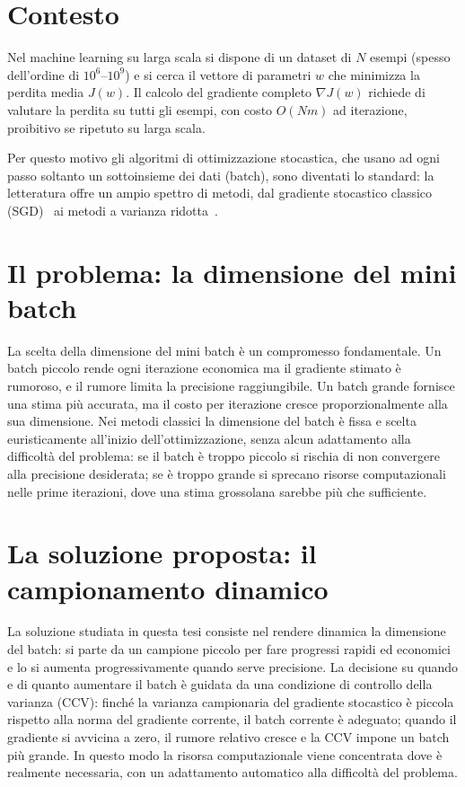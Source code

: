 \documentclass[italian, a4paper, twoside, binding=6mm]{sapthesis}
\begin{document}
\section{Contesto}

Nel machine learning su larga scala si dispone di un dataset di $N$
esempi (spesso dell'ordine di $10^6$--$10^9$) e si cerca il vettore di
parametri $w$ che minimizza la perdita media $J(w)$. Il calcolo del gradiente
completo $\nabla J(w)$ richiede di valutare la perdita su tutti gli esempi,
con costo $O(Nm)$ ad iterazione, proibitivo se ripetuto su larga scala.

Per questo motivo gli algoritmi di ottimizzazione stocastica, che usano ad ogni
passo soltanto un sottoinsieme dei dati (batch), sono diventati lo standard: la
letteratura offre un ampio spettro di metodi, dal gradiente stocastico classico
(SGD)~\cite{robbins1951, bottou2008} ai metodi a varianza
ridotta~\cite{defazio2014, johnson2013}.

\section{Il problema: la dimensione del mini batch}

La scelta della dimensione del mini batch è un compromesso fondamentale. Un
batch piccolo rende ogni iterazione economica ma il gradiente stimato è
rumoroso, e il rumore limita la precisione raggiungibile. Un batch
grande fornisce una stima più accurata, ma il costo per iterazione cresce
proporzionalmente alla sua dimensione. Nei metodi classici la dimensione del
batch è fissa e scelta euristicamente all'inizio
dell'ottimizzazione, senza alcun adattamento alla difficoltà del problema:
se il batch è troppo piccolo si rischia di non convergere alla precisione
desiderata; se è troppo grande si sprecano risorse computazionali nelle prime
iterazioni, dove una stima grossolana sarebbe più che sufficiente.

\section{La soluzione proposta: il campionamento dinamico}

La soluzione studiata in questa tesi consiste nel rendere dinamica la
dimensione del batch: si parte da un campione piccolo per fare progressi rapidi
ed economici e lo si aumenta progressivamente quando serve precisione. La
decisione su quando e di quanto aumentare il batch è guidata da
una condizione di controllo della varianza (CCV): finché la varianza
campionaria del gradiente stocastico è piccola rispetto alla norma del
gradiente corrente, il batch corrente è adeguato; quando il gradiente si
avvicina a zero, il rumore relativo cresce e la CCV impone un batch più grande.
In questo modo la risorsa computazionale viene concentrata dove è realmente
necessaria, con un adattamento automatico alla difficoltà del problema.
\end{document}
